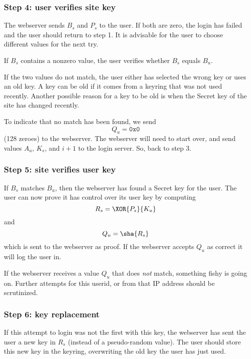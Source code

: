 \subsubsection{Step 4: user verifies site key}
\label{sec:login_step4}
The webserver sends $B_s$ and $P_s$ to the user.
If both are zero, the login has failed and the user should return to step 1.
It is advisable for the user to choose different values for the next try.
\par
If $B_s$ contains a nonzero value, the user verifies whether $B_s$ equals $B_u$.
\par
If the two values do not match, the user either has selected the wrong key or uses an old key.
A key can be old if it comes from a keyring that was not used recently.
Another possible reason for a key to be old is when the Secret key of the site has changed recently.
\par
To indicate that no match has been found, we send
\[Q_u=\mathtt{0x0}\]
(128 zeroes) to the webserver.
The webserver will need to start over, and send values $A_u$, $K_s$, and $i+1$ to the login server.
So, back to step 3.

\subsubsection{Step 5: site verifies user key}
\label{sec:login_step5}
If $B_s$ matches $B_u$, then the webserver has found a Secret key for the user.
The user can now prove it has control over its user key by computing
\[R_s=\XOR{P_s}{K_u}\]
and
\[Q_u=\sha{R_s}\]
which is sent to the webserver as proof.
If the webserver accepts $Q_u$ as correct it will log the user in.
\par
If the webserver receives a value $Q_u$ that does \emph{not} match,
something fishy is going on.
Further attempts for this userid, or from that IP address should be scrutinized.

\subsubsection{Step 6: key replacement}
\label{sec:login_step6}
If this attempt to login was not the first with this key,
the webserver has sent the user a new key in $R_s$ (instead of a pseudo-random value).
The user should store this new key in the keyring, overwriting the old key the user has just used.

